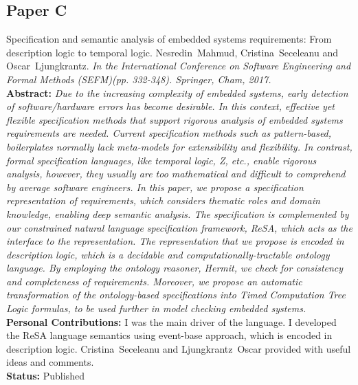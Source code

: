 \subsection*{Paper C}
	Specification and semantic analysis of embedded systems requirements: From description logic to temporal logic. Nesredin~Mahmud, Cristina~Seceleanu and Oscar~Ljungkrantz. \textit{In the International Conference on Software Engineering and Formal Methods (SEFM)(pp. 332-348). Springer, Cham, 2017.}\label{lbl_resadl}\\[6pt]%
	\textbf{Abstract:} \textit{Due to the increasing complexity of embedded systems, early detection of software/hardware errors has become desirable. In this context, effective yet flexible specification methods that support rigorous analysis of embedded systems requirements are needed. Current specification methods such as pattern-based, boilerplates normally lack meta-models for extensibility and flexibility. In contrast, formal specification languages, like temporal logic, Z, etc., enable rigorous analysis, however, they usually are too mathematical and difficult to comprehend by average software engineers. In this paper, we propose a specification representation of requirements, which considers thematic roles and domain knowledge, enabling deep semantic analysis. The specification is complemented by our constrained natural language specification framework, ReSA, which acts as the interface to the representation. The representation that we propose is encoded in description logic, which is a decidable and computationally-tractable ontology language. By employing the ontology reasoner, Hermit, we check for consistency and completeness of requirements. Moreover, we propose an automatic transformation of the ontology-based specifications into Timed Computation Tree Logic formulas, to be used further in model checking embedded systems.}\\[6pt]%
	\textbf{Personal Contributions:} I was the main driver of the language. I developed the ReSA language semantics using event-base approach, which is encoded in description logic. Cristina~Seceleanu and Ljungkrantz~Oscar provided with useful ideas and comments.\\
	\textbf{Status:} Published

